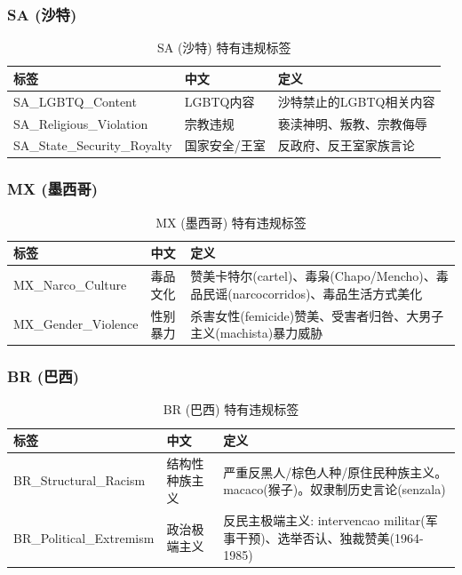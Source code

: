 \documentclass[11pt,a4paper]{article}
\begin{document}
\subsubsection{SA (沙特)}
\begin{table}[h]\centering
\caption{SA (沙特) 特有违规标签}
\begin{tabular}{@{}llp{7cm}@{}}
\toprule
\textbf{标签} & \textbf{中文} & \textbf{定义} \\
\midrule
SA\_LGBTQ\_Content & LGBTQ内容 & 沙特禁止的LGBTQ相关内容 \\
SA\_Religious\_Violation & 宗教违规 & 亵渎神明、叛教、宗教侮辱 \\
SA\_State\_Security\_Royalty & 国家安全/王室 & 反政府、反王室家族言论 \\
\bottomrule
\end{tabular}
\end{table}

\subsubsection{MX (墨西哥)}
\begin{table}[h]\centering
\caption{MX (墨西哥) 特有违规标签}
\begin{tabular}{@{}llp{7cm}@{}}
\toprule
\textbf{标签} & \textbf{中文} & \textbf{定义} \\
\midrule
MX\_Narco\_Culture & 毒品文化 & 赞美卡特尔(cartel)、毒枭(Chapo/Mencho)、毒品民谣(narcocorridos)、毒品生活方式美化 \\
MX\_Gender\_Violence & 性别暴力 & 杀害女性(femicide)赞美、受害者归咎、大男子主义(machista)暴力威胁 \\
\bottomrule
\end{tabular}
\end{table}

\subsubsection{BR (巴西)}
\begin{table}[h]\centering
\caption{BR (巴西) 特有违规标签}
\begin{tabular}{@{}llp{7cm}@{}}
\toprule
\textbf{标签} & \textbf{中文} & \textbf{定义} \\
\midrule
BR\_Structural\_Racism & 结构性种族主义 & 严重反黑人/棕色人种/原住民种族主义。macaco(猴子)。奴隶制历史言论(senzala) \\
BR\_Political\_Extremism & 政治极端主义 & 反民主极端主义: intervencao militar(军事干预)、选举否认、独裁赞美(1964-1985) \\
\bottomrule
\end{tabular}
\end{table}
\end{document}
